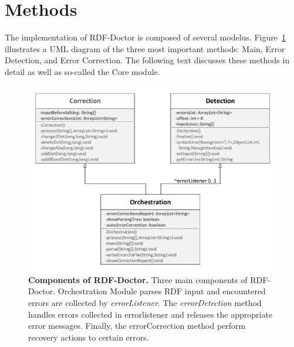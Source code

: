 
\section {Methods} 

The implementation of RDF-Doctor is composed of several modelus.
{Figure~\ref{Fig:UML}} illustrates a UML diagram of the three most important methods: Main, Error Detection, and Error Correction. 
The following text discusses these methods in detail as well as so-called the Core module.%

	\begin{figure}[ht]
	\begin{center}
		\includegraphics[scale=0.65,angle=0]{images/methods.pdf}
		\setlength{\abovecaptionskip}{0pt} 
				\setlength\belowcaptionskip{-5mm}
		\caption{\textbf{Components of RDF-Doctor.} 
		Three main components of RDF-Doctor. 
		Orchestration Module parses RDF input and encountered errors are collected by \emph{errorListener}.
		The \emph{errorDetection} method handles errors collected in errorlistener and releases the appropriate error messages.
		Finally, the errorCorrection method perform recovery actions to certain errors.}
		\label{Fig:UML}
	\end{center}
\end{figure}


